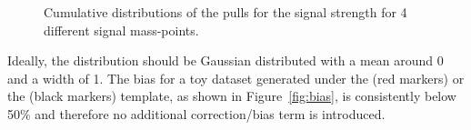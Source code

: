 \begin{figure}[h!]
\caption{Cumulative distributions of the pulls for the signal strength for 4 different signal mass-points.}
\label{fig:pullsMuCombo16}
\end{figure}
Ideally, the distribution should be Gaussian distributed with a mean around 0 and a width of 1. The bias for a toy dataset generated under the  (red markers) or the \HERWIG{++} (black markers) template, as shown in Figure~\ref{fig:bias}, is consistently below 50\% and therefore no additional correction/bias term is introduced.
